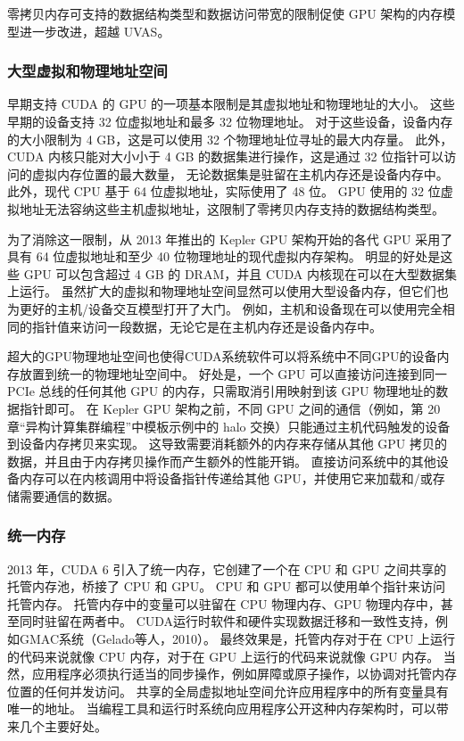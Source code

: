 零拷贝内存可支持的数据结构类型和数据访问带宽的限制促使 GPU 架构的内存模型进一步改进，超越 UVAS。

\subsubsection{大型虚拟和物理地址空间}
早期支持 CUDA 的 GPU 的一项基本限制是其虚拟地址和物理地址的大小。 这些早期的设备支持 32 位虚拟地址和最多 32 位物理地址。 
对于这些设备，设备内存的大小限制为 4 GB，这是可以使用 32 个物理地址位寻址的最大内存量。 
此外，CUDA 内核只能对大小小于 4 GB 的数据集进行操作，这是通过 32 位指针可以访问的虚拟内存位置的最大数量，
无论数据集是驻留在主机内存还是设备内存中。 此外，现代 CPU 基于 64 位虚拟地址，实际使用了 48 位。 
GPU 使用的 32 位虚拟地址无法容纳这些主机虚拟地址，这限制了零拷贝内存支持的数据结构类型。

为了消除这一限制，从 2013 年推出的 Kepler GPU 架构开始的各代 GPU 采用了具有 64 位虚拟地址和至少 40 位物理地址的现代虚拟内存架构。 
明显的好处是这些 GPU 可以包含超过 4 GB 的 DRAM，并且 CUDA 内核现在可以在大型数据集上运行。 
虽然扩大的虚拟和物理地址空间显然可以使用大型设备内存，但它们也为更好的主机/设备交互模型打开了大门。 
例如，主机和设备现在可以使用完全相同的指针值来访问一段数据，无论它是在主机内存还是设备内存中。

超大的GPU物理地址空间也使得CUDA系统软件可以将系统中不同GPU的设备内存放置到统一的物理地址空间中。 
好处是，一个 GPU 可以直接访问连接到同一 PCIe 总线的任何其他 GPU 的内存，只需取消引用映射到该 GPU 物理地址的数据指针即可。 
在 Kepler GPU 架构之前，不同 GPU 之间的通信（例如，第 20 章“异构计算集群编程”中模板示例中的 halo 交换）只能通过主机代码触发的设备到设备内存拷贝来实现。 
这导致需要消耗额外的内存来存储从其他 GPU 拷贝的数据，并且由于内存拷贝操作而产生额外的性能开销。 
直接访问系统中的其他设备内存可以在内核调用中将设备指针传递给其他 GPU，并使用它来加载和/或存储需要通信的数据。

\subsubsection{统一内存}
2013 年，CUDA 6 引入了统一内存，它创建了一个在 CPU 和 GPU 之间共享的托管内存池，桥接了 CPU 和 GPU。
CPU 和 GPU 都可以使用单个指针来访问托管内存。 
托管内存中的变量可以驻留在 CPU 物理内存、GPU 物理内存中，甚至同时驻留在两者中。 
CUDA运行时软件和硬件实现数据迁移和一致性支持，例如GMAC系统（Gelado等人，2010）。 
最终效果是，托管内存对于在 CPU 上运行的代码来说就像 CPU 内存，对于在 GPU 上运行的代码来说就像 GPU 内存。 
当然，应用程序必须执行适当的同步操作，例如屏障或原子操作，以协调对托管内存位置的任何并发访问。 
共享的全局虚拟地址空间允许应用程序中的所有变量具有唯一的地址。 
当编程工具和运行时系统向应用程序公开这种内存架构时，可以带来几个主要好处。

